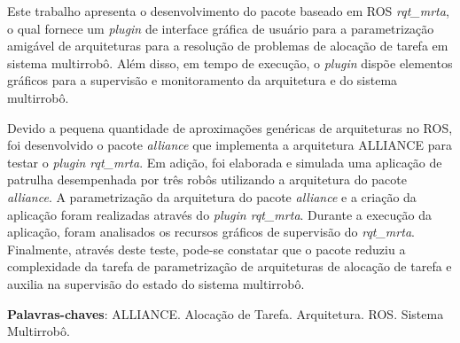 \newpage
\begin{resumo}
    Este trabalho apresenta o desenvolvimento do pacote baseado em ROS \textit{rqt\_mrta}, o qual fornece um \textit{plugin} de interface gráfica de usuário para a parametrização amigável de arquiteturas para a resolução de problemas de alocação de tarefa em sistema multirrobô. Além disso, em tempo de execução, o \textit{plugin} dispõe elementos gráficos para a supervisão e monitoramento da arquitetura e do sistema multirrobô. 
    
    Devido a pequena quantidade de aproximações genéricas de arquiteturas no ROS, foi desenvolvido o pacote \textit{alliance} que implementa a arquitetura ALLIANCE para testar o \textit{plugin rqt\_mrta}. Em adição, foi elaborada e simulada uma aplicação de patrulha desempenhada por três robôs utilizando a arquitetura do pacote \textit{alliance}. A parametrização da arquitetura do pacote \textit{alliance} e a criação da aplicação foram realizadas através do \textit{plugin rqt\_mrta}. Durante a execução da aplicação, foram analisados os recursos gráficos de supervisão do \textit{rqt\_mrta}. Finalmente, através deste teste, pode-se constatar que o pacote reduziu a complexidade da tarefa de parametrização de arquiteturas de alocação de tarefa e auxilia na supervisão do estado do sistema multirrobô.
    
    \vspace{\onelineskip}
    
    \noindent
    \textbf{Palavras-chaves}: ALLIANCE. Alocação de Tarefa. Arquitetura. ROS. Sistema Multirrobô. 
\end{resumo}
\newpage